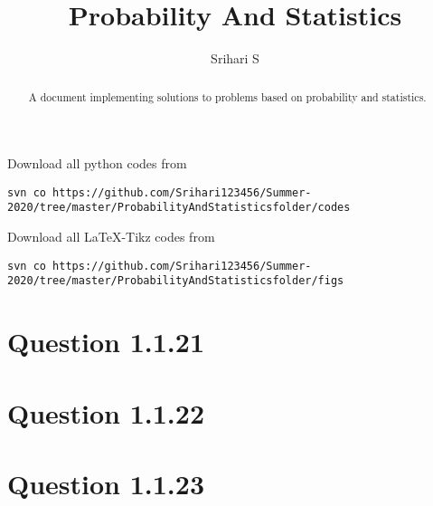 \documentclass[journal,12pt,twocolumn]{IEEEtran}
\begin{document}
\newcommand{\mydet}[1]{\ensuremath{\begin{vmatrix}#1\end{vmatrix}}}
\makeatletter
{}
\makeatother
\let\StandardTheFigure\thefigure
\let\vec\mathbf
\def\putbox#1#2#3{\makebox[0in][l]{\makebox[#1][l]{}\raisebox{\baselineskip}[0in][0in]{\raisebox{#2}[0in][0in]{#3}}}}
     \def\rightbox#1{\makebox[0in][r]{#1}}
     \def\centbox#1{\makebox[0in]{#1}}
     \def\topbox#1{\raisebox{-\baselineskip}[0in][0in]{#1}}
     \def\midbox#1{\raisebox{-0.5\baselineskip}[0in][0in]{#1}}
\vspace{3cm}
\title{Probability And Statistics}
\author{Srihari S}


\maketitle
\begin{abstract}
A document implementing solutions to problems based on probability and statistics.
\end{abstract}
Download all python codes from 
%
\begin{lstlisting}
svn co https://github.com/Srihari123456/Summer-2020/tree/master/ProbabilityAndStatisticsfolder/codes
\end{lstlisting}
Download all \LaTeX{}-Tikz codes from 
%
\begin{lstlisting}
svn co https://github.com/Srihari123456/Summer-2020/tree/master/ProbabilityAndStatisticsfolder/figs
\end{lstlisting}

\section{\textbf{Question 1.1.21}}

\section{\textbf{Question 1.1.22}}

\section{\textbf{Question 1.1.23}}

\end{document}

